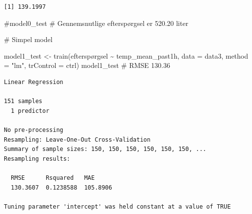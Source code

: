 \documentclass[
  12pt,
  a4paper,
  DIV=11,
  numbers=noendperiod]{scrartcl}
\newenvironment{Shaded}{\begin{snugshade}}{\end{snugshade}}
\newcommand{\AttributeTok}[1]{\textcolor[rgb]{0.40,0.45,0.13}{#1}}
\newcommand{\CommentTok}[1]{\textcolor[rgb]{0.37,0.37,0.37}{#1}}
\newcommand{\DecValTok}[1]{\textcolor[rgb]{0.68,0.00,0.00}{#1}}
\newcommand{\FunctionTok}[1]{\textcolor[rgb]{0.28,0.35,0.67}{#1}}
\newcommand{\NormalTok}[1]{\textcolor[rgb]{0.00,0.23,0.31}{#1}}
\newcommand{\OtherTok}[1]{\textcolor[rgb]{0.00,0.23,0.31}{#1}}
\newcommand{\SpecialCharTok}[1]{\textcolor[rgb]{0.37,0.37,0.37}{#1}}
\newcommand{\StringTok}[1]{\textcolor[rgb]{0.13,0.47,0.30}{#1}}
\begin{document}
\begin{Shaded}
\end{Shaded}

\begin{verbatim}
[1] 139.1997
\end{verbatim}

\begin{Shaded}
\begin{Highlighting}[numbers=left,,]
\CommentTok{\#model0\_test \# Gennemsnutlige efterspørgsel er 520.20 liter }

\CommentTok{\# Simpel model}

\NormalTok{model1\_test }\OtherTok{\textless{}{-}} \FunctionTok{train}\NormalTok{(efterspørgsel }\SpecialCharTok{\textasciitilde{}}\NormalTok{ temp\_mean\_past1h, }\AttributeTok{data =}\NormalTok{ data3, }
                     \AttributeTok{method =} \StringTok{"lm"}\NormalTok{, }\AttributeTok{trControl =}\NormalTok{ ctrl)}
\NormalTok{model1\_test }\CommentTok{\# RMSE 130.36}
\end{Highlighting}
\end{Shaded}

\begin{verbatim}
Linear Regression 

151 samples
  1 predictor

No pre-processing
Resampling: Leave-One-Out Cross-Validation 
Summary of sample sizes: 150, 150, 150, 150, 150, 150, ... 
Resampling results:

  RMSE      Rsquared   MAE     
  130.3607  0.1238588  105.8906

Tuning parameter 'intercept' was held constant at a value of TRUE
\end{verbatim}
\end{document}
